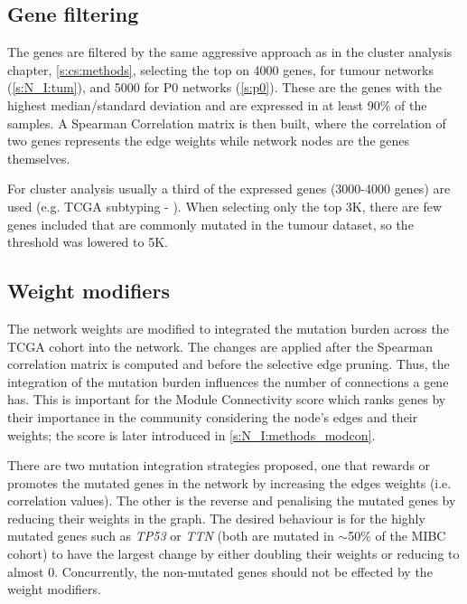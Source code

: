 \subsection{Gene filtering} \label{s:N_I:gene_filtering}

The genes are filtered by the same aggressive approach as in the cluster analysis chapter, \cref{s:cs:methods}, selecting the top on 4000 genes, for tumour networks (\cref{s:N_I:tum}), and 5000 for P0 networks (\cref{s:p0}). These are the genes with the highest median/standard deviation and are expressed in at least 90\% of the samples. A Spearman Correlation matrix is then built, where the correlation of two genes represents the edge weights while network nodes are the genes themselves. 

For cluster analysis usually a third of the expressed genes (3000-4000 genes) are used (e.g. TCGA subtyping - \citet{Robertson2017-mg}). When selecting only the top 3K, there are few genes included that are commonly mutated in the tumour dataset, so the threshold was lowered to 5K.

\subsection{Weight modifiers} \label{s:N_I:weight_modifiers}

The network weights are modified to integrated the mutation burden across the TCGA cohort into the network. The changes are applied after the Spearman correlation matrix is computed and before the selective edge pruning. Thus, the integration of the mutation burden influences the number of connections a gene has. This is important for the Module Connectivity score which ranks genes by their importance in the community considering the node's edges and their weights; the score is later introduced in \cref{s:N_I:methods_modcon}.

There are two mutation integration strategies proposed, one that rewards or promotes the mutated genes in the network by increasing the edges weights (i.e. correlation values). The other is the reverse and penalising the mutated genes by reducing their weights in the graph. The desired behaviour is for the highly mutated genes such as \textit{TP53} or \textit{TTN} (both are mutated in $\sim$50\% of the MIBC cohort) to have the largest change by either doubling their weights or reducing to almost 0. Concurrently, the non-mutated genes should not be effected by the weight modifiers.

